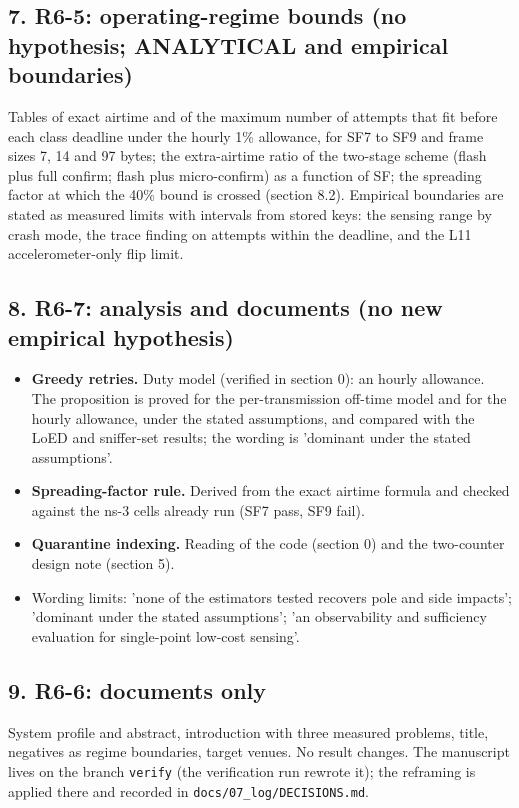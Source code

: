 \subsection*{7. R6-5: operating-regime bounds (no hypothesis; ANALYTICAL and empirical boundaries)}

Tables of exact airtime and of the maximum number of attempts that fit before each class deadline under the hourly 1\% allowance, for SF7 to SF9 and frame sizes 7, 14 and 97 bytes; the extra-airtime ratio of the two-stage scheme (flash plus full confirm; flash plus micro-confirm) as a function of SF; the spreading factor at which the 40\% bound is crossed (section 8.2). Empirical boundaries are stated as measured limits with intervals from stored keys: the sensing range by crash mode, the trace finding on attempts within the deadline, and the L11 accelerometer-only flip limit.

\subsection*{8. R6-7: analysis and documents (no new empirical hypothesis)}

\begin{itemize}
\item \textbf{Greedy retries.} Duty model (verified in section 0): an hourly allowance. The proposition is proved for the per-transmission off-time model and for the hourly allowance, under the stated assumptions, and compared with the LoED and sniffer-set results; the wording is 'dominant under the stated assumptions'.
\item \textbf{Spreading-factor rule.} Derived from the exact airtime formula and checked against the ns-3 cells already run (SF7 pass, SF9 fail).
\item \textbf{Quarantine indexing.} Reading of the code (section 0) and the two-counter design note (section 5).
\item Wording limits: 'none of the estimators tested recovers pole and side impacts'; 'dominant under the stated assumptions'; 'an observability and sufficiency evaluation for single-point low-cost sensing'.
\end{itemize}

\subsection*{9. R6-6: documents only}

System profile and abstract, introduction with three measured problems, title, negatives as regime boundaries, target venues. No result changes. The manuscript lives on the branch \texttt{verify} (the verification run rewrote it); the reframing is applied there and recorded in \texttt{docs/07\_log/DECISIONS.md}.

